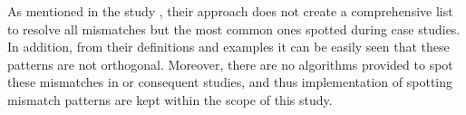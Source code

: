 As mentioned in the study \cite{dijkman2007mismatch}, their approach does not create a comprehensive list to resolve all mismatches but the most common ones spotted during case studies. In addition, from their definitions and examples it can be easily seen that these patterns are not orthogonal. Moreover, there are no algorithms provided to spot these mismatches in \cite{dijkman2007mismatch} or consequent studies, and thus implementation of spotting mismatch patterns are kept within the scope of this study.